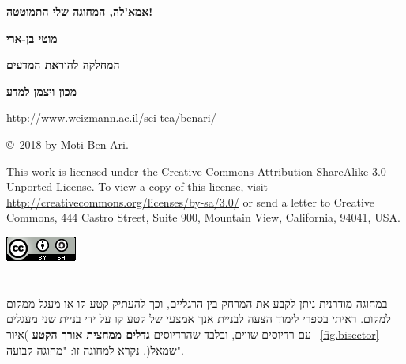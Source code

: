 \documentclass[12pt,a4paper]{article}
\begin{document}
\thispagestyle{empty}


\begin{center}
\textbf{\Huge%
אמא'לה, המחוגה שלי התמוטטה!
}

\bigskip

\bigskip

\textbf{\Large מוטי בן-ארי}

\bigskip

\textbf{\Large המחלקה להוראת המדעים}

\bigskip

\textbf{\Large מכון ויצמן למדע}

\bigskip

\url{http://www.weizmann.ac.il/sci-tea/benari/}
\end{center}

\bigskip
\bigskip

\begin{center}
\copyright{}\  2018 by Moti Ben-Ari.

\end{center}


{\small This work is licensed under the Creative Commons Attribution-ShareAlike 3.0 Unported License. To view a copy of this license, visit \url{http://creativecommons.org/licenses/by-sa/3.0/} or send a letter to Creative Commons, 444 Castro Street, Suite 900, Mountain View, California, 94041, USA.}

\bigskip

\begin{center}
\includegraphics[width=.2\textwidth]{../by-sa.png}
\end{center}


\newpage


\section{
}

במחוגה מודרנית ניתן לקבע את המרחק בין הרגליים, וכך להעתיק קטע קו או מעגל ממקום למקום. ראיתי בספרי לימוד הצעה לבניית אנך אמצעי של קטע קו על ידי בניית שני מעגלים עם רדיוסים שווים, ובלבד שהרדיוסים
\textbf{גדלים ממחצית אורך הקטע}
 )איור~%
\ref{fig.bisector}
שמאל(. נקרא למחוגה זו: "מחוגה קבועה".
\end{document}
